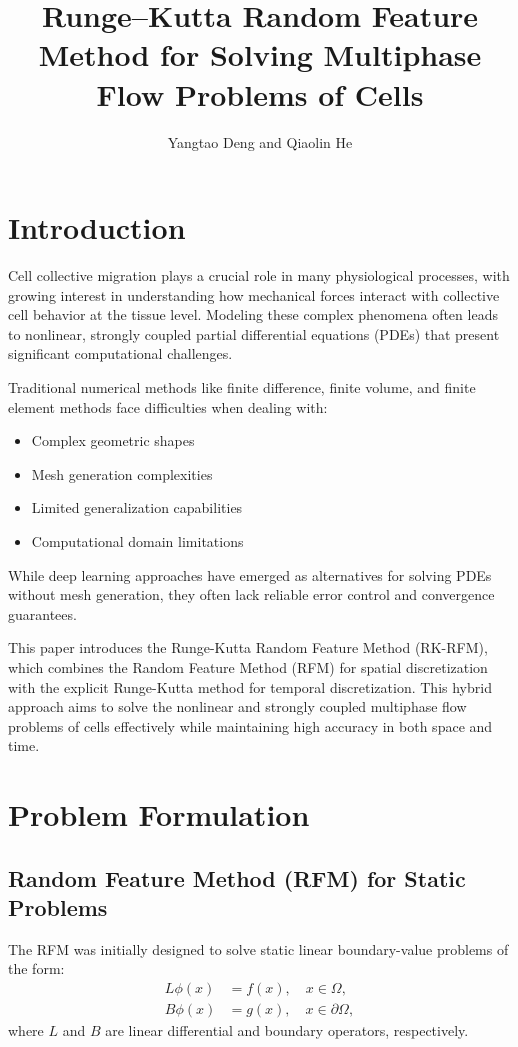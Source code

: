 \documentclass[11pt]{article}
\title{Runge--Kutta Random Feature Method for Solving Multiphase Flow Problems of Cells}
\author{Yangtao Deng and Qiaolin He}
\date{}
\begin{document}
\maketitle

\section{Introduction}

Cell collective migration plays a crucial role in many physiological processes, with growing interest in understanding how mechanical forces interact with collective cell behavior at the tissue level. Modeling these complex phenomena often leads to nonlinear, strongly coupled partial differential equations (PDEs) that present significant computational challenges.

Traditional numerical methods like finite difference, finite volume, and finite element methods face difficulties when dealing with:
\begin{itemize}
    \item Complex geometric shapes
    \item Mesh generation complexities
    \item Limited generalization capabilities
    \item Computational domain limitations
\end{itemize}

While deep learning approaches have emerged as alternatives for solving PDEs without mesh generation, they often lack reliable error control and convergence guarantees.

This paper introduces the Runge-Kutta Random Feature Method (RK-RFM), which combines the Random Feature Method (RFM) for spatial discretization with the explicit Runge-Kutta method for temporal discretization. This hybrid approach aims to solve the nonlinear and strongly coupled multiphase flow problems of cells effectively while maintaining high accuracy in both space and time.

\section{Problem Formulation}

\subsection{Random Feature Method (RFM) for Static Problems}

The RFM was initially designed to solve static linear boundary-value problems of the form:
\begin{align}
    L\phi(x) &= f(x), \quad x \in \Omega,\\
    B\phi(x) &= g(x), \quad x \in \partial\Omega,
\end{align}
where $L$ and $B$ are linear differential and boundary operators, respectively.
\end{document}
